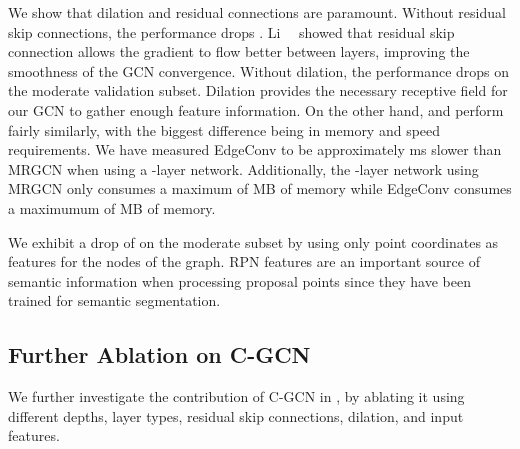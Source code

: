 \documentclass[10pt,twocolumn,letterpaper]{article}
\begin{document}
We show that dilation and residual connections are paramount.
Without residual skip connections, the performance drops .
Li~\etal~\cite{li2019deepgcns_journal} showed that residual skip connection allows the gradient to flow better between layers, improving the smoothness of the GCN convergence.
Without dilation, the performance drops  on the moderate validation subset.
Dilation provides the necessary receptive field for our GCN to gather enough feature information.
On the other hand, \MRGCN and \EdgeConv perform fairly similarly, with the biggest difference being in memory and speed requirements. 
We have measured EdgeConv to be approximately ms slower than MRGCN when using a -layer network.
Additionally, the -layer network using MRGCN only consumes a maximum of MB of memory while EdgeConv consumes a maximumum of MB of memory. 



We exhibit a drop of  on the moderate subset by using only point coordinates as features for the nodes of the graph.
RPN features are an important source of semantic information when processing proposal points since they have been trained for semantic segmentation.







\subsection{Further Ablation on C-GCN}

We further investigate the contribution of C-GCN in , by ablating it using different depths, layer types, residual skip connections, dilation, and input features.
\end{document}
